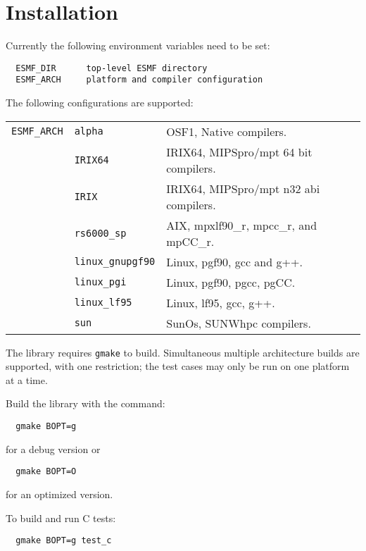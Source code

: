 
\section{Installation}

Currently the following environment variables need to be set:
\begin{verbatim}
  ESMF_DIR      top-level ESMF directory
  ESMF_ARCH     platform and compiler configuration
\end{verbatim}

\noindent The following configurations are supported:

\begin{tabular}{lll}
{\tt ESMF\_ARCH}  & {\tt alpha}      &  OSF1, Native compilers. \\
                  & {\tt IRIX64}     &  IRIX64, MIPSpro/mpt 64 bit compilers. \\
                  & {\tt IRIX}       &  IRIX64, MIPSpro/mpt n32 abi compilers. \\
                  & {\tt rs6000\_sp}  &  AIX, mpxlf90\_r, mpcc\_r, and mpCC\_r.  \\
                  & {\tt linux\_gnupgf90} & Linux, pgf90, gcc and g++.  \\
                  & {\tt linux\_pgi}  &  Linux, pgf90, pgcc, pgCC. \\
                  & {\tt linux\_lf95} &  Linux, lf95, gcc, g++. \\
                  & {\tt sun}        &  SunOs, SUNWhpc compilers. \\
\end{tabular}

\smallskip

The library requires {\tt gmake} to build.  Simultaneous multiple architecture builds are supported, with
one restriction; the test cases may only be run on one platform at a time. 

\smallskip

\noindent Build the library with the command:
\begin{verbatim}
  gmake BOPT=g  
\end{verbatim}
  for a debug version or
\begin{verbatim}
  gmake BOPT=O  
\end{verbatim}
  for an optimized version.

\noindent To build and run C tests:
\begin{verbatim}
  gmake BOPT=g test_c
\end{verbatim}

